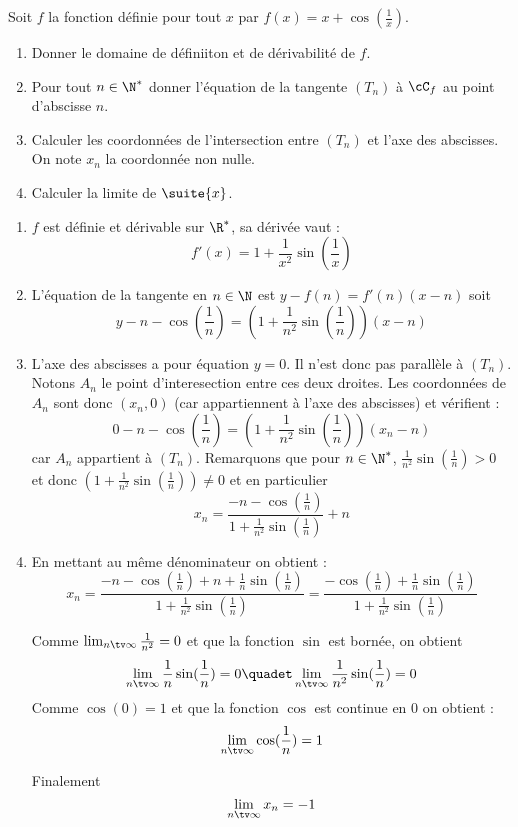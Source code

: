 




\begin{exercice}
Soit $f$ la fonction définie pour tout $x$ par $f(x) = x+\cos\left(\frac{1}{x}\right).$
\begin{enumerate}
\item Donner le domaine de définiiton et de dérivabilité de $f$. 
\item Pour tout $n\in\N^* $ donner l'équation de la tangente 
$(T_n)$ à $\cC_f$ au point d'abscisse $n$. 
\item Calculer les coordonnées de  l'intersection entre $(T_n)$ et l'axe des abscisses. On note $x_n$ la coordonnée non nulle. 
\item Calculer la limite de $\suite{x}$. 
\end{enumerate}
\end{exercice}

\begin{correction}
\begin{enumerate}
\item $f$ est définie et dérivable sur $\R^*$, sa dérivée vaut :
$$f'(x) = 1 + \frac{1}{x^2}\sin(\frac{1}{x})$$
\item L'équation de la tangente en $n\in \N$ est 
$ y- f(n) = f'(n) (x-n)$
soit 
$$y -n -\cos(\frac{1}{n}) = ( 1 + \frac{1}{n^2}\sin(\frac{1}{n}))(x-n)$$
\item L'axe des abscisses a pour équation $y=0$. Il n'est donc pas parallèle à $(T_n)$. Notons $A_n$ le point d'interesection entre ces deux droites. 
Les coordonnées de $A_n$ sont donc $(x_n,0)$ (car appartiennent à l'axe des abscisses) et vérifient : 
$$  0-n -\cos(\frac{1}{n}) = ( 1 + \frac{1}{n^2}\sin(\frac{1}{n}))(x_n-n)$$
car $A_n$ appartient à $(T_n)$. Remarquons que pour $n\in \N^*$, $\frac{1}{n^2}\sin(\frac{1}{n})>0 $ et donc $( 1 + \frac{1}{n^2}\sin(\frac{1}{n})) \neq 0$ et en particulier $$x_n =  \frac{-n -\cos(\frac{1}{n})}{ 1 + \frac{1}{n^2}\sin(\frac{1}{n}) }+n$$

\item En mettant au même dénominateur on obtient : 
$$x_n = \frac{-n -\cos(\frac{1}{n}) +n +\frac{1}{n}\sin(\frac{1}{n})}{ 1 + \frac{1}{n^2}\sin(\frac{1}{n}) }=\frac{ -\cos(\frac{1}{n}) +\frac{1}{n}\sin(\frac{1}{n})}{ 1 + \frac{1}{n^2}\sin(\frac{1}{n}) } $$

Comme $ \lim_{n\tv \infty} \frac{1}{n^2} = 0$ et que la fonction $\sin$  est bornée, on obtient 
$$ \lim_{n\tv \infty} \frac{1}{n}\sin(\frac{1}{n})=0\quadet \lim_{n\tv \infty}  \frac{1}{n^2}\sin(\frac{1}{n})= 0$$
Comme $\cos(0)=1$ et que la fonction $\cos$ est continue en $0$ on obtient : 
$$  \lim_{n\tv \infty} \cos(\frac{1}{n}) = 1$$

Finalement $$ \lim_{n\tv \infty} x_n =-1$$


\end{enumerate}
\end{correction}